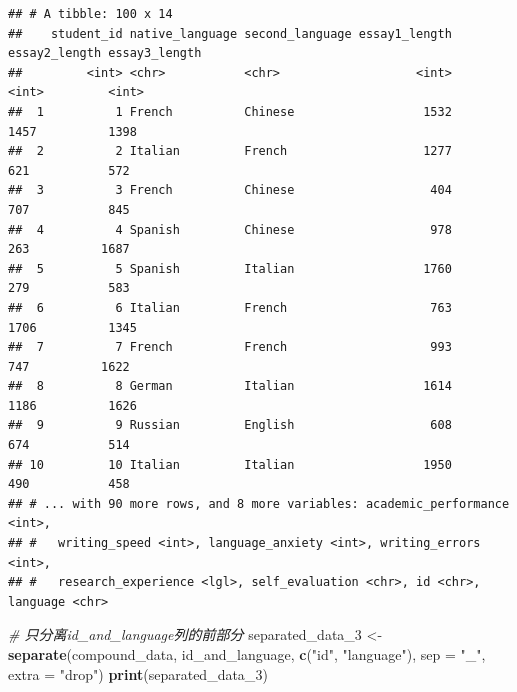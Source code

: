 \documentclass[]{book}
\newenvironment{Shaded}{\begin{snugshade}}{\end{snugshade}}
\newcommand{\CommentTok}[1]{\textcolor[rgb]{0.56,0.35,0.01}{\textit{#1}}}
\newcommand{\DataTypeTok}[1]{\textcolor[rgb]{0.13,0.29,0.53}{#1}}
\newcommand{\DecValTok}[1]{\textcolor[rgb]{0.00,0.00,0.81}{#1}}
\newcommand{\KeywordTok}[1]{\textcolor[rgb]{0.13,0.29,0.53}{\textbf{#1}}}
\newcommand{\NormalTok}[1]{#1}
\newcommand{\StringTok}[1]{\textcolor[rgb]{0.31,0.60,0.02}{#1}}
\begin{document}
\begin{verbatim}
## # A tibble: 100 x 14
##    student_id native_language second_language essay1_length essay2_length essay3_length
##         <int> <chr>           <chr>                   <int>         <int>         <int>
##  1          1 French          Chinese                  1532          1457          1398
##  2          2 Italian         French                   1277           621           572
##  3          3 French          Chinese                   404           707           845
##  4          4 Spanish         Chinese                   978           263          1687
##  5          5 Spanish         Italian                  1760           279           583
##  6          6 Italian         French                    763          1706          1345
##  7          7 French          French                    993           747          1622
##  8          8 German          Italian                  1614          1186          1626
##  9          9 Russian         English                   608           674           514
## 10         10 Italian         Italian                  1950           490           458
## # ... with 90 more rows, and 8 more variables: academic_performance <int>,
## #   writing_speed <int>, language_anxiety <int>, writing_errors <int>,
## #   research_experience <lgl>, self_evaluation <chr>, id <chr>, language <chr>
\end{verbatim}

\begin{Shaded}
\begin{Highlighting}[]
\CommentTok{# 只分离id_and_language列的前部分}
\NormalTok{separated_data_}\DecValTok{3}\NormalTok{ <-}\StringTok{ }\KeywordTok{separate}\NormalTok{(compound_data, id_and_language, }\KeywordTok{c}\NormalTok{(}\StringTok{"id"}\NormalTok{, }\StringTok{"language"}\NormalTok{), }\DataTypeTok{sep =} \StringTok{"_"}\NormalTok{, }\DataTypeTok{extra =} \StringTok{"drop"}\NormalTok{)}
\KeywordTok{print}\NormalTok{(separated_data_}\DecValTok{3}\NormalTok{)}
\end{Highlighting}
\end{Shaded}
\end{document}
